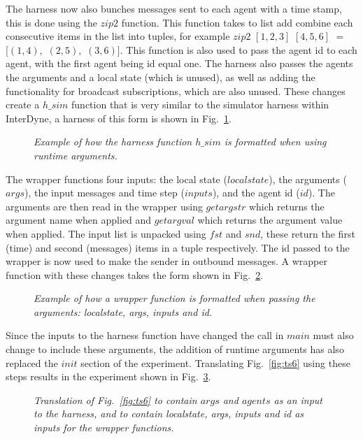 \documentclass{article}
\begin{document}
The harness now also bunches messages sent to each agent with a time stamp, this is done using the $zip2$ function. This function takes to list add combine each consecutive items in the list into tuples, for example $zip2$ $[1,2,3]$ $[4,5,6]$ $=$ $[(1,4),$ $(2,5),$ $(3,6)]$. This function is also used to pass the agent id to each agent, with the first agent being id equal one. The harness also passes the agents the arguments and a local state (which is unused), as well as adding the functionality for broadcast subscriptions, which are also unused. These changes create a $h\_sim$ function that is very similar to the simulator harness within InterDyne, a harness of this form is shown in Fig.~\ref{fig:harn7}.  
\begin{figure}[H]
	\centering
	
	\caption{\it Example of how the harness function $h\_sim$ is formatted when using runtime arguments.}
	\label{fig:harn7}
\end{figure} 

The wrapper functions four inputs: the local state ($localstate$), the arguments ($args$), the input messages and time step ($inputs$), and the agent id ($id$). The arguments are then read in the wrapper using $getargstr$ which returns the argument name when applied and $getargval$ which returns the argument value when applied. The input list is unpacked using $fst$ and $snd$, these return the first (time) and second (messages) items in a tuple respectively. The id passed to the wrapper is now used to make the sender in outbound messages. A wrapper function with these changes takes the form shown in Fig.~\ref{fig:wrap7}. 
\begin{figure}[H]
	\centering
	
	\caption{\it Example of how a wrapper function is formatted when passing the arguments: localstate, args, inputs and id.}
	\label{fig:wrap7}
\end{figure} 

Since the inputs to the harness function have changed the call in $main$ must also change to include these arguments, the addition of runtime arguments has also replaced the $init$ section of the experiment. Translating Fig.~\ref{fig:ts6} using these steps results in the experiment shown in Fig.~\ref{fig:ts7}.

\begin{figure}[H]
	\centering
	
	\caption{\it Translation of Fig.~\ref{fig:ts6} to contain $args$ and $agents$ as an input to the harness, and to contain localstate, args, inputs and id as inputs for the wrapper functions.}
	\label{fig:ts7}
\end{figure} 
\end{document}

